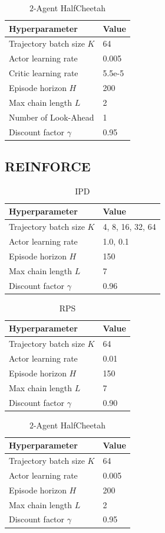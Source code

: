 \begin{table}[H]
\centering
\begin{tabular}{l|l}
Hyperparameter & Value \\ \hline
Trajectory batch size $K$ & 64 \\
Actor learning rate & 0.005 \\
Critic learning rate & 5.5e-5 \\
Episode horizon $H$ & 200 \\
Max chain length $L$ & 2 \\
Number of Look-Ahead & 1 \\
Discount factor $\gamma$ & 0.95 \\
\end{tabular}
\caption{$2$-Agent HalfCheetah}
\end{table}

\subsection{REINFORCE}
\begin{table}[H]
\centering
\begin{tabular}{l|l}
Hyperparameter & Value \\ \hline
Trajectory batch size $K$ & 4, 8, 16, 32, 64 \\
Actor learning rate & 1.0, 0.1 \\
Episode horizon $H$ & 150 \\
Max chain length $L$ & 7 \\
Discount factor $\gamma$ & 0.96 \\
\end{tabular}
\caption{IPD}
\end{table}

\begin{table}[H]
\centering
\begin{tabular}{l|l}
Hyperparameter & Value \\ \hline
Trajectory batch size $K$ & 64 \\
Actor learning rate & 0.01 \\
Episode horizon $H$ & 150 \\
Max chain length $L$ & 7 \\
Discount factor $\gamma$ & 0.90 \\
\end{tabular}
\caption{RPS}
\end{table}

\begin{table}[H]
\centering
\begin{tabular}{l|l}
Hyperparameter & Value \\ \hline
Trajectory batch size $K$ & 64 \\
Actor learning rate & 0.005 \\
Episode horizon $H$ & 200 \\
Max chain length $L$ & 2 \\
Discount factor $\gamma$ & 0.95 \\
\end{tabular}
\caption{$2$-Agent HalfCheetah}
\end{table}